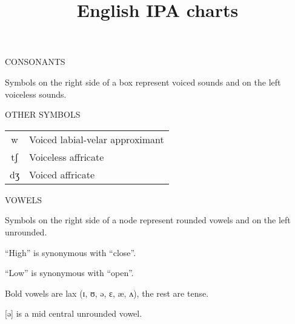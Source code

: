 \documentclass{article}
\title{English IPA charts}
\date{}
\newcommand{\headspace}{0.4cm}
\begin{document}
  \maketitle
  CONSONANTS

  \vspace{\headspace}

  \begin{adjustbox}{width=\textwidth}
    
  \end{adjustbox}

  {\tiny *Symbols on the right side of a box represent voiced sounds and on the left voiceless sounds.}

  \vspace{2cm}

  \parbox[l]{0.5\textwidth}{
    OTHER SYMBOLS

    \vspace{\headspace}

    \begin{adjustbox}{width=0.3\textwidth}
      \begin{tabular}{c l}
        w  & Voiced labial-velar approximant \\
        tʃ & Voiceless affricate \\
        dʒ & Voiced affricate
      \end{tabular}
    \end{adjustbox}
  }
  \parbox[r]{0.5\textwidth}{
    VOWELS

    \vspace{\headspace}

    \begin{adjustbox}{width=0.4\textwidth}
      
    \end{adjustbox}
  }

  \begin{flushright}
    {\tiny
      Symbols on the right side of a node represent rounded vowels and on the left unrounded.

      ``High'' is synonymous with ``close''.

      ``Low'' is synonymous with ``open''.

      Bold vowels are lax (ɪ, ʊ, ə, ɛ, æ, ʌ), the rest are tense.

      {[}ə] is a mid central unrounded vowel.
    }
  \end{flushright}

  {\small
    
  }
\end{document}
